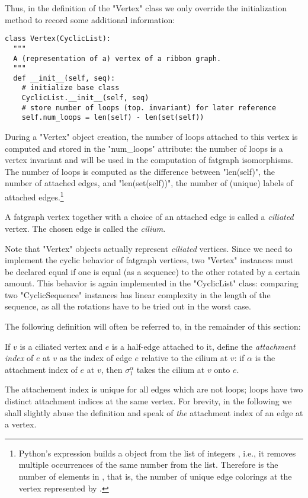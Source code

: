 Thus, in the definition of the "Vertex" class we only override the
initialization method to record some additional information:
\begin{lstlisting}
class Vertex(CyclicList):
  """
  A (representation of a) vertex of a ribbon graph.
  """
  def __init__(self, seq):
    # initialize base class
    CyclicList.__init__(self, seq)
    # store number of loops (top. invariant) for later reference
    self.num_loops = len(self) - len(set(self))

\end{lstlisting}
During a "Vertex" object creation, the number of loops attached to
this vertex is computed and stored in the "num_loops" attribute: the
number of loops is a vertex invariant and will be used in the
computation of fatgraph isomorphisms.  The number of loops is computed
as the difference between "len(self)", the number of attached edges,
and "len(set(self))", the number of (unique) labels of attached
edges.\footnote{Python's expression  builds a 
  object from the list of integers , i.e., it removes multiple
  occurrences of the same number from the list.  Therefore
   is the number of elements in , that
  is, the number of unique edge colorings at the vertex represented by
  .}

\begin{definition}
  A fatgraph vertex together with a choice of an attached edge is
  called a \emph{ciliated} vertex.  The chosen edge is called the
  \emph{cilium}.
\end{definition}
Note that "Vertex" objects actually represent \emph{ciliated} vertices.
Since we need to implement the cyclic behavior of fatgraph vertices,
two "Vertex" instances must be declared equal if one is equal (as a
sequence) to the other rotated by a certain amount.  This behavior is
again implemented in the "CyclicList" class: comparing two
"CyclicSequence" instances has linear complexity in the length of
the sequence, as all the rotations have to be tried out in the worst
case.

The following definition will often be referred to, in the remainder
of this section:
\begin{definition}
  If $v$ is a ciliated vertex and $e$ is a half-edge attached to it, define
  the \emph{attachment index} of $e$ at $v$ as the index of edge $e$ relative
  to the cilium at $v$: if $\alpha$ is the attachment index of $e$ at
  $v$, then $\sigma_1^\alpha$ takes the cilium at $v$ onto $e$.
\end{definition}
The attachement index is unique for all edges which are not loops;
loops have two distinct attachment indices at the same vertex.  For
brevity, in the following we shall slightly abuse the definition and
speak of \emph{the} attachment index of an edge at a vertex.


